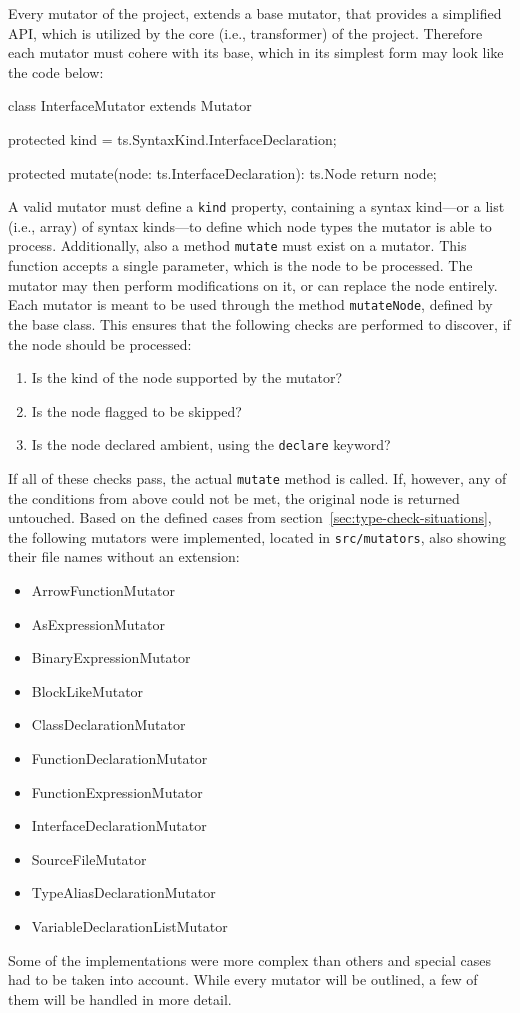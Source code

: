 Every mutator of the project, extends a base mutator, that provides a simplified API, which is utilized by the core (i.e., transformer) of the project. Therefore each mutator must cohere with its base, which in its simplest form may look like the code below:
\begin{JsCode}[numbers=none]
class InterfaceMutator extends Mutator {

  protected kind = ts.SyntaxKind.InterfaceDeclaration;
  
  protected mutate(node: ts.InterfaceDeclaration): ts.Node {
    return node;
  }

}
\end{JsCode}
A valid mutator must define a \texttt{kind} property, containing a syntax kind---or a list (i.e., array) of syntax kinds---to define which node types the mutator is able to process. Additionally, also a method \texttt{mutate} must exist on a mutator. This function accepts a single parameter, which is the node to be processed. The mutator may then perform modifications on it, or can replace the node entirely. Each mutator is meant to be used through the method \texttt{mutateNode}, defined by the base class. This ensures that the following checks are performed to discover, if the node should be processed:
\begin{enumerate}
  \item Is the kind of the node supported by the mutator?
  \item Is the node flagged to be skipped?
  \item Is the node declared ambient, using the \texttt{declare} keyword?
\end{enumerate}
If all of these checks pass, the actual \texttt{mutate} method is called. If, however, any of the conditions from above could not be met, the original node is returned untouched. Based on the defined cases from section~\ref{sec:type-check-situations}, the following mutators were implemented, located in \texttt{src/mutators}, also showing their file names without an extension:
\begin{itemize}
  \item ArrowFunctionMutator
  \item AsExpressionMutator
  \item BinaryExpressionMutator
  \item BlockLikeMutator
  \item ClassDeclarationMutator
  \item FunctionDeclarationMutator
  \item FunctionExpressionMutator
  \item InterfaceDeclarationMutator
  \item SourceFileMutator
  \item TypeAliasDeclarationMutator
  \item VariableDeclarationListMutator
\end{itemize}
Some of the implementations were more complex than others and special cases had to be taken into account. While every mutator will be outlined, a few of them will be handled in more detail.

